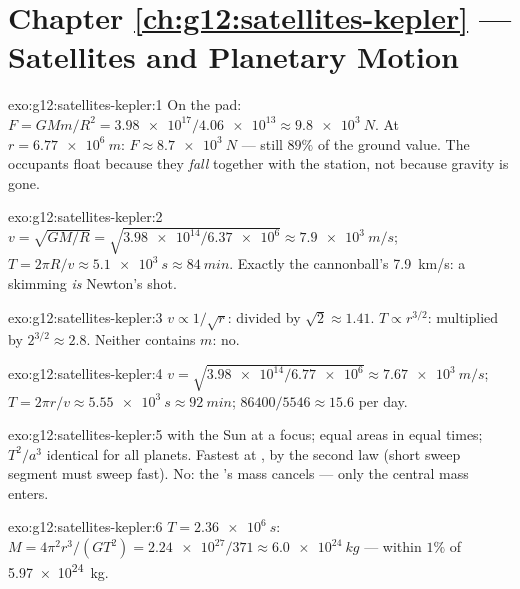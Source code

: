 \section*{Chapter \ref{ch:g12:satellites-kepler} --- Satellites and Planetary Motion}

\begin{solution}{exo:g12:satellites-kepler:1}
On the pad: $F = GMm/R^2 = \num{3.98e17}/\num{4.06e13} \approx
\qty{9.8e3}{N}$. At $r = \qty{6.77e6}{m}$:
$F \approx \qty{8.7e3}{N}$ --- still $89\%$ of the ground value. The
occupants float because they \emph{fall} together with the station,
not because gravity is gone.
\end{solution}

\begin{solution}{exo:g12:satellites-kepler:2}
$v = \sqrt{GM/R} = \sqrt{\num{3.98e14}/\num{6.37e6}} \approx
\qty{7.9e3}{m/s}$; $T = 2\pi R/v \approx \qty{5.1e3}{s} \approx
\qty{84}{min}$. Exactly the cannonball's \qty{7.9}{km/s}: a skimming
 \emph{is} Newton's shot.
\end{solution}

\begin{solution}{exo:g12:satellites-kepler:3}
$v \propto 1/\sqrt{r}$: divided by $\sqrt 2 \approx 1.41$.
$T \propto r^{3/2}$: multiplied by $2^{3/2} \approx 2.8$. Neither
contains $m$: no.
\end{solution}

\begin{solution}{exo:g12:satellites-kepler:4}
$v = \sqrt{\num{3.98e14}/\num{6.77e6}} \approx \qty{7.67e3}{m/s}$;
$T = 2\pi r/v \approx \qty{5.55e3}{s} \approx \qty{92}{min}$;
$\num{86400}/5546 \approx 15.6$  per day.
\end{solution}

\begin{solution}{exo:g12:satellites-kepler:5}
 with the Sun at a focus; equal areas in equal times;
$T^2/a^3$ identical for all planets. Fastest at , by the
second law (short sweep segment must sweep fast). No: the 's
mass cancels --- only the central mass enters.
\end{solution}

\begin{solution}{exo:g12:satellites-kepler:6}
$T = \qty{2.36e6}{s}$: $M = 4\pi^2 r^3/(GT^2) =
\num{2.24e27}/371 \approx \qty{6.0e24}{kg}$ --- within $1\%$ of
\qty{5.97e24}{kg}.
\end{solution}

